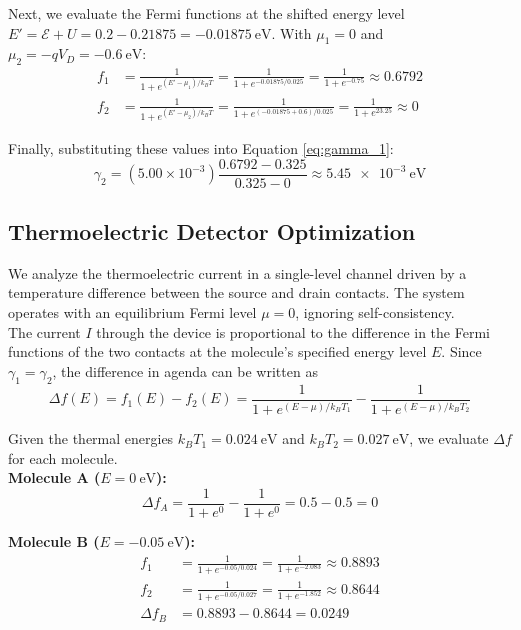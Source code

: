 \documentclass[a4paper, 10pt]{article}
\begin{document}
\noindent Next, we evaluate the Fermi functions at the shifted energy level $E' = \mathcal{E} + U = 0.2 - 0.21875 = \SI{-0.01875}{\eV}$. With $\mu_1 = 0$ and $\mu_2 = -qV_D = \SI{-0.6}{\eV}$:
\begin{align*}
    f_1 &= \frac{1}{1 + e^{(E' - \mu_1)/k_B T}} = \frac{1}{1 + e^{-0.01875/0.025}} = \frac{1}{1 + e^{-0.75}} \approx 0.6792 \\
    f_2 &= \frac{1}{1 + e^{(E' - \mu_2)/k_B T}} = \frac{1}{1 + e^{(-0.01875 + 0.6)/0.025}} = \frac{1}{1 + e^{23.25}} \approx 0
\end{align*}

\noindent Finally, substituting these values into Equation \ref{eq:gamma_1}:
\[
    \gamma_2 = (5.00 \times 10^{-3}) \frac{0.6792 - 0.325}{0.325 - 0} \approx \boxed{\SI{5.45e-3}{\eV}}
\]

\subsection{Thermoelectric Detector Optimization}
We analyze the thermoelectric current in a single-level channel driven by a temperature difference between the source and drain contacts. The system operates with an equilibrium Fermi level $\mu = 0$, ignoring self-consistency.\\

\noindent The current $I$ through the device is proportional to the difference in the Fermi functions of the two contacts at the molecule's specified energy level $E$. Since $\gamma_1 = \gamma_2$, the difference in agenda can be written as
\begin{equation} \label{eq:delta_f}
    \Delta f(E) = f_1(E) - f_2(E) = \frac{1}{1 + e^{(E - \mu)/k_B T_1}} - \frac{1}{1 + e^{(E - \mu)/k_B T_2}}
\end{equation}

\noindent Given the thermal energies $k_B T_1 = \SI{0.024}{\eV}$ and $k_B T_2 = \SI{0.027}{\eV}$, we evaluate $\Delta f$ for each molecule.\\

\noindent \textbf{Molecule A ($E = \SI{0}{\eV}$):}
\[
    \Delta f_A = \frac{1}{1 + e^0} - \frac{1}{1 + e^0} = 0.5 - 0.5 = 0
\]

\noindent \textbf{Molecule B ($E = \SI{-0.05}{\eV}$):}
\begin{align*}
    f_1 &= \frac{1}{1 + e^{-0.05/0.024}} = \frac{1}{1 + e^{-2.083}} \approx 0.8893 \\
    f_2 &= \frac{1}{1 + e^{-0.05/0.027}} = \frac{1}{1 + e^{-1.852}} \approx 0.8644 \\
    \Delta f_B &= 0.8893 - 0.8644 = 0.0249
\end{align*}
\end{document}
